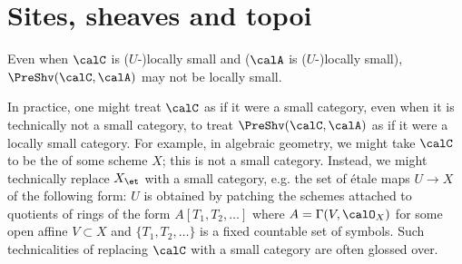 












\section{Sites, sheaves and topoi}







\begin{remark}
    Even when $\calC$ is ($U$-)locally small and ($\calA$ is ($U$-)locally small), $\PreShv(\calC, \calA)$ may not be locally small.
\end{remark}
\begin{remark}
    In practice, one might treat $\calC$ as if it were a small category, even when it is technically not a small category, to treat $\PreShv(\calC, \calA)$ as if it were a locally small category. For example, in algebraic geometry, we might take $\calC$ to be the  of some scheme $X$; this is not a small category. Instead, we might technically replace $X_{\et}$ with a small category, e.g. the set of \'etale maps $U \to X$ of the following form: $U$ is obtained by patching the schemes attached to quotients of rings of the form $A[T_1,T_2,\ldots]$ where $A = \Gamma(V, \calO_X)$ for some open affine $V \subset X$ and $\{T_1,T_2,\ldots\}$ is a fixed countable set of symbols. Such technicalities of replacing $\calC$ with a small category are often glossed over.
\end{remark}

